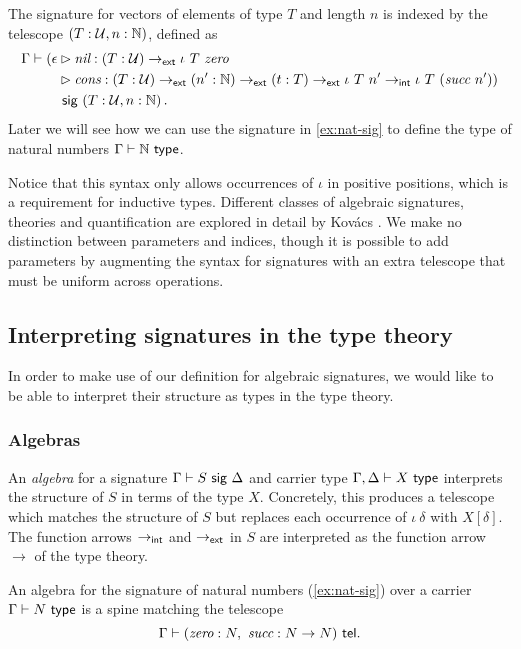 \begin{example}[Vectors]\label{ex:vec-sig}
The signature for vectors of elements of type $T$ and length $n$ is indexed by the telescope $(T : \mathcal{U}, n : \mathbb{N})$,
defined as
\begin{align*}
\Gamma \vdash (\epsilon &\rhd \n{nil} : (T : \univ) \to\external \iota\ T\ \n{zero} \\
&\rhd \n{cons} : (T : \univ) \to\external (n' : \mathbb{N}) \to\external (t : T) \to\external \iota\ T\ n' \to\internal \iota\ T\ (\n{succ}\ n')) \\
&\sig (T : \univ, n : \mathbb{N}) \,.
\end{align*}
Later we will see how we can use the signature in \cref{ex:nat-sig} to define the type of natural numbers $\Gamma \vdash \mathbb{N} \ \textsf{type}$.
\end{example}

Notice that this syntax only allows occurrences of $\iota$ in positive
positions, which is a requirement for inductive types.
Different classes of algebraic signatures, theories and quantification are explored in detail by
Kov\'acs \cite{Kovacs2023-gq}.
We make no distinction between parameters and indices, though it is possible to add parameters by
augmenting the syntax for signatures with an extra telescope that must be uniform across operations.

\subsection{Interpreting signatures in the type theory} \label{sub:algebras}

In order to make use of our definition for algebraic signatures, we would like to be able to
interpret their structure as types in the type theory.

\subsubsection{Algebras}
An \emph{algebra} for a signature
$\Gamma \vdash S \ \textsf{sig}\  \Delta$ and carrier type $\Gamma, \Delta \vdash X \ \textsf{type}$
interprets the structure of $S$ in terms of the type $X$. Concretely,
this produces a telescope which matches the structure of $S$ but replaces each
occurrence of $\iota\ \delta$ with $X[\delta]$. The function arrows $\to_{\textsf{int}}$ and
$\to_{\textsf{ext}}$ in $S$ are interpreted as the function arrow $\to$
of the type theory.

\begin{example}\label{ex:nat-alg}
An algebra for the signature of natural numbers (\cref{ex:nat-sig}) over a carrier $\Gamma \vdash N \ \textsf{type}$ is a spine matching
the telescope \[\Gamma \vdash (\textit{zero}: N,\ \textit{succ}: N \to N) \ \textsf{tel}.\]
\end{example}

